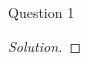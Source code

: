 \begin{solution}{Question 1}\label{ques:1}
    \begin{question}
    \end{question}
    \tcblower{}
    \begin{proof}[Solution]
    \end{proof}
\end{solution}
